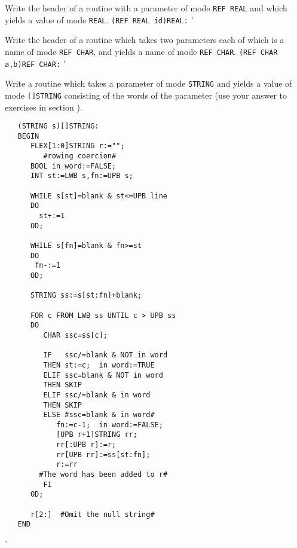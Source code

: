 \begin{exercise}
\item Write the header of a routine with a parameter of mode
\verb|REF REAL| and which yields a value of mode \verb|REAL|.
\ans \verb|(REF REAL id)REAL:|
'
\item Write the header of a routine which takes two parameters each of
which is a name of mode \verb|REF CHAR|, and yields a name of mode
\verb|REF CHAR|. \ans \verb|(REF CHAR a,b)REF CHAR:|
'
\item Write a routine which takes a parameter of mode \verb|STRING| and
yields a value of mode \verb|[]STRING| consisting of the words of the
parameter (use your answer to exercises in section ).
\ans \ %
\begin{verbatim}
   (STRING s)[]STRING:
   BEGIN
      FLEX[1:0]STRING r:="";
         #rowing coercion#
      BOOL in word:=FALSE;
      INT st:=LWB s,fn:=UPB s;

      WHILE s[st]=blank & st<=UPB line
      DO
        st+:=1
      OD;

      WHILE s[fn]=blank & fn>=st
      DO
       fn-:=1
      OD;

      STRING ss:=s[st:fn]+blank;

      FOR c FROM LWB ss UNTIL c > UPB ss
      DO
         CHAR ssc=ss[c];

         IF   ssc/=blank & NOT in word
         THEN st:=c;  in word:=TRUE
         ELIF ssc=blank & NOT in word
         THEN SKIP
         ELIF ssc/=blank & in word
         THEN SKIP
         ELSE #ssc=blank & in word#
            fn:=c-1;  in word:=FALSE;
            [UPB r+1]STRING rr;
            rr[:UPB r]:=r;
            rr[UPB rr]:=ss[st:fn];
            r:=rr
        #The word has been added to r#
         FI
      OD;

      r[2:]  #Omit the null string#
   END
\end{verbatim}
'
\end{exercise}

